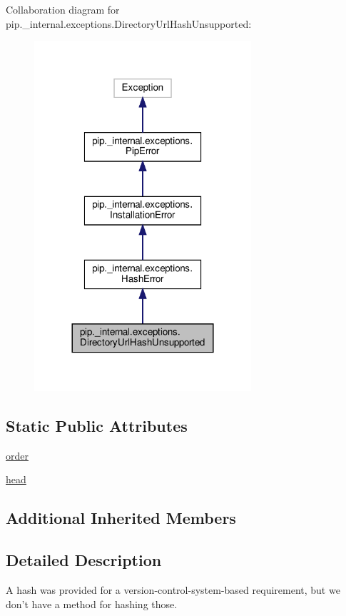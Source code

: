 Collaboration diagram for pip.\+\_\+internal.\+exceptions.\+Directory\+Url\+Hash\+Unsupported\+:
\nopagebreak
\begin{figure}[H]
\begin{center}
\leavevmode
\includegraphics[width=228pt]{classpip_1_1__internal_1_1exceptions_1_1DirectoryUrlHashUnsupported__coll__graph}
\end{center}
\end{figure}
\subsection*{Static Public Attributes}
\begin{DoxyCompactItemize}
\item 
\hyperlink{classpip_1_1__internal_1_1exceptions_1_1DirectoryUrlHashUnsupported_afe3ec9e12b72039c2e7dfc74a0a1e3f9}{order}
\item 
\hyperlink{classpip_1_1__internal_1_1exceptions_1_1DirectoryUrlHashUnsupported_a9c3dfe9cf7d07494919cc9b2252c08c8}{head}
\end{DoxyCompactItemize}
\subsection*{Additional Inherited Members}


\subsection{Detailed Description}
\begin{DoxyVerb}A hash was provided for a version-control-system-based requirement, but
we don't have a method for hashing those.\end{DoxyVerb}
 

